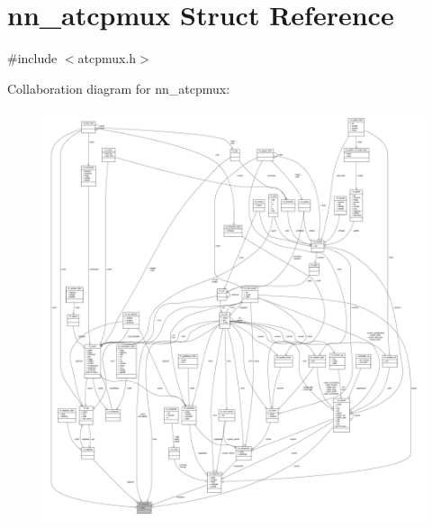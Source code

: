 \hypertarget{structnn__atcpmux}{}\section{nn\+\_\+atcpmux Struct Reference}
\label{structnn__atcpmux}


{\ttfamily \#include $<$atcpmux.\+h$>$}



Collaboration diagram for nn\+\_\+atcpmux\+:\nopagebreak
\begin{figure}[H]
\begin{center}
\leavevmode
\includegraphics[width=350pt]{structnn__atcpmux__coll__graph}
\end{center}
\end{figure}
